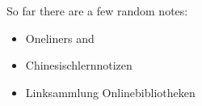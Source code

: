 \documentclass{article}
\author{T. Wöhrl}
\date{2017-02-16}
\title{}
\begin{document}
\tableofcontents



So far there are a few random notes:
\begin{itemize}
\item Oneliners and
\item Chinesischlernnotizen
\item Linksammlung Onlinebibliotheken
\end{itemize}
\end{document}
